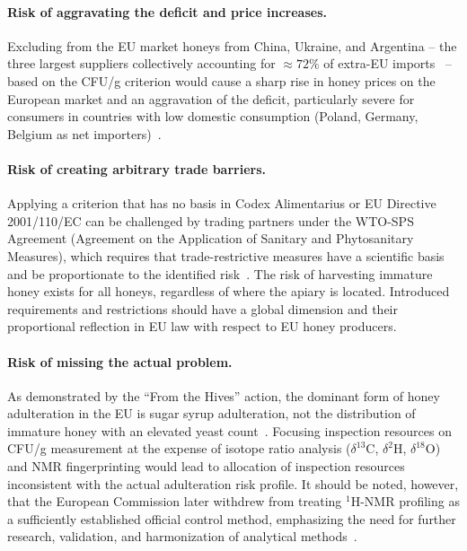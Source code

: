 \paragraph{Risk of aggravating the deficit and price increases.}
Excluding from the EU market honeys from China, Ukraine, and
Argentina -- the three largest suppliers collectively accounting
for $\approx 72\%$ of extra-EU imports~\cite{tridge2024} -- based
on the CFU/g criterion would cause a sharp rise in honey prices
on the European market and an aggravation of the deficit,
particularly severe for consumers in countries with low domestic
consumption (Poland, Germany, Belgium as net
importers)~\cite{eurostat_honey2023}.

\paragraph{Risk of creating arbitrary trade barriers.}
Applying a criterion that has no basis in Codex Alimentarius or
EU Directive 2001/110/EC can be challenged by trading partners
under the WTO-SPS Agreement (Agreement on the Application of
Sanitary and Phytosanitary Measures), which requires that
trade-restrictive measures have a scientific basis and be
proportionate to the identified risk~\cite{codex_stan12,eudir2001110}.
The risk of harvesting immature honey exists for all honeys,
regardless of where the apiary is located. Introduced requirements
and restrictions should have a global dimension and their
proportional reflection in EU law with respect to EU honey producers.


\paragraph{Risk of missing the actual problem.}
As demonstrated by the ``From the Hives'' action, the dominant
form of honey adulteration in the EU is sugar syrup adulteration,
not the distribution of immature honey with an elevated yeast
count~\cite{eufromhives2021}.
Focusing inspection resources on CFU/g measurement at the expense
of isotope ratio analysis ($\delta^{13}$C, $\delta^{2}$H,
$\delta^{18}$O) and NMR fingerprinting would lead to allocation
of inspection resources inconsistent with the actual adulteration
risk profile.
It should be noted, however, that the European Commission later
withdrew from treating $^1$H-NMR profiling as a sufficiently
established official control method, emphasizing the need for
further research, validation, and harmonization of analytical
methods~\cite{EuropeanCommission2023NMR}.


